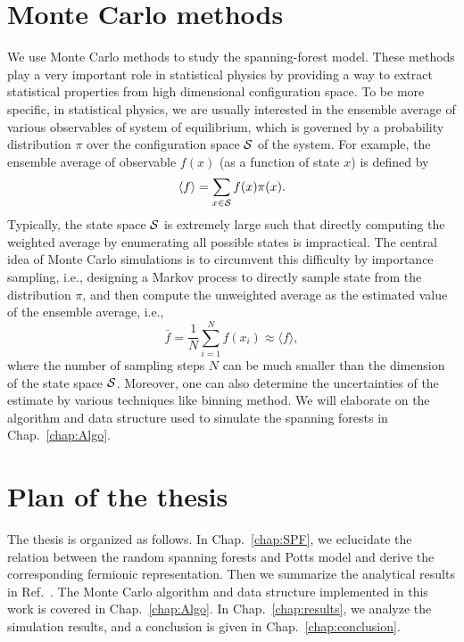 \section{Monte Carlo methods}
We use Monte Carlo methods to study the spanning-forest model. These methods play a very important role in statistical physics by
providing a way to extract statistical properties from high dimensional configuration space. To be more specific, in statistical
physics, we are usually interested in the ensemble average of various observables of system of equilibrium, which is governed by a probability distribution $\pi$ over the configuration space ${\mathcal S}$ of the system. 
For example,  the ensemble average of observable $f(x)$ (as a function of state $x$) is defined by
\begin{equation}
	\langle f \rangle = \sum_{x \in {\mathcal S}} f(x) \pi(x).
\end{equation}
Typically, the state space ${\mathcal S}$ is extremely large such that directly computing the weighted average by enumerating all possible states is impractical.
The central idea of Monte Carlo simulations is to circumvent this difficulty by importance sampling, i.e., designing a Markov process to directly sample state from the distribution
$\pi$, and then compute the unweighted average as the estimated value of the ensemble average, i.e.,
\begin{equation}
	\bar{f} = \frac{1}{N}\sum_{i=1}^N f(x_i) \approx \langle f \rangle,
\end{equation}
where the number of sampling steps $N$ can be much smaller than the dimension of the state space ${\mathcal S}$. 
Moreover, one can also determine the uncertainties of the estimate by various techniques like binning method.
We will elaborate on the algorithm and data structure used to simulate the spanning forests in Chap.~\ref{chap:Algo}.

\section{Plan of the thesis}
The thesis is organized as follows. In Chap.~\ref{chap:SPF}, we eclucidate the relation between the random spanning forests and
Potts model and derive the corresponding fermionic representation. Then we summarize the analytical results in Ref.~.
The Monte Carlo algorithm and data structure implemented in this work is covered in Chap.~\ref{chap:Algo}. In Chap.~\ref{chap:results}, we analyze the simulation results, and a conclusion is given in Chap.~\ref{chap:conclusion}.


